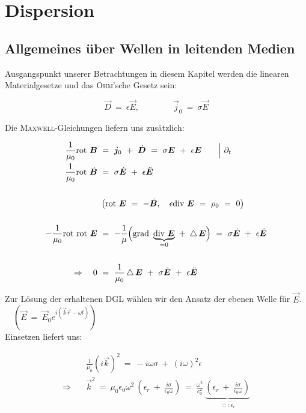 \chapter{Dispersion}

\section{Allgemeines über Wellen in leitenden Medien}

Ausgangspunkt unserer Betrachtungen in diesem Kapitel werden die linearen Materialgesetze und das \textsc{Ohm}'sche Gesetz sein:

\begin{equation*}
\vec{D}  \ = \ \epsilon \vec{E}, \qquad\qquad\vec{j}_0  \ = \ \sigma\vec{E}
\end{equation*}

Die \textsc{Maxwell}-Gleichungen liefern uns zusätzlich:

\begin{align*}
\frac{1}{\mu_0}\rot\vec{B}  \ &= \  \vec{j}_0 \ + \ \dot{\vec{D}}  \ = \ \sigma\vec{E} \ + \ \epsilon\vec{E} \qquad\Big| \ \partial_t\\
\frac{1}{\mu_0}\rot\dot{\vec{B}} \ &= \ \sigma\dot{\vec{E}} \ + \ \epsilon\ddot{\vec{E}}\\
\ \\
&\left(\rot\vec{E} \ = \ -\dot{\vec{B}}, \quad \epsilon\div\vec{E} \ = \ \rho_0  \ = \ 0\right)\\
\ \\
-\frac{1}{\mu_0} \rot\rot \vec{E}  \ &= \ - \frac{1}{\mu}\Big(\grad\underbrace{\div\vec{E}}_{=0} \ + \ \laplace\vec{E}\Big)  \ = \ \sigma\dot{\vec{E}} \ + \ \epsilon\ddot{\vec{E}}\\
\ \\
\Rightarrow \quad 0  \ &= \ \frac{1}{\mu_0}\laplace\vec{E} \ + \ \sigma\dot{\vec{E}}\ + \ \epsilon\ddot{\vec{E}} 
\end{align*}

Zur Lösung der erhaltenen DGL wählen wir den Ansatz der ebenen Welle für $\vec{E}$. $\quad(\vec{E} \ = \ \vec{E}_0 e^{i(\vec{k}\vec{r}-\omega t)})$\\
Einsetzen liefert uns:

\begin{align*}
&\frac{1}{\mu_0} \left(i\vec{k}\right)^2  \ = \ -i \omega \sigma \ + \  \left(i\omega\right)^2\epsilon\\
\Rightarrow\quad &\vec{k}^2 \ = \ \mu_0\epsilon_0\omega^2 \ \left(\epsilon_r \ + \ \frac{i\sigma}{\epsilon_0\omega}\right) \ = \ \frac{\omega^2}{c_0^2} \ \underbrace{\left(\epsilon_r \ + \ \frac{i\sigma}{\epsilon_0 \omega}\right)}_{=:\tilde{\epsilon}_r}
\end{align*}


